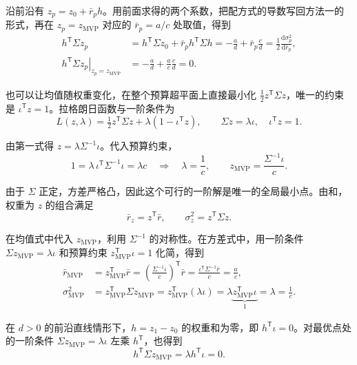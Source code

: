 \begin{solution}[label-content={方法二（沿前沿对配方后的方差式求导）},blank-type=none]
沿前沿有 $z_p=z_0+\bar r_p h$。用前面求得的两个系数，把配方式的导数写回方法一的形式，再在 $z_p=z_{\mathrm{MVP}}$ 对应的 $\bar r_p=a/c$ 处取值，得到
\[
 \begin{aligned}
 h^{\mathsf T}\Sigma z_p
 &=h^{\mathsf T}\Sigma z_0+\bar r_p h^{\mathsf T}\Sigma h
 =-\frac ad+\bar r_p\frac cd
 =\frac12\frac{\mathrm d\sigma_p^2}{\mathrm d\bar r_p},\\
 \left.h^{\mathsf T}\Sigma z_p\right|_{z_p=z_{\mathrm{MVP}}}
 &=-\frac ad+\frac ac\frac cd=0.
 \end{aligned}
\]
\end{solution}

\begin{solution}[label-content={方法三（拉格朗日法）},blank-type=none]
也可以让均值随权重变化，在整个预算超平面上直接最小化 $\tfrac12 z^{\mathsf T}\Sigma z$，唯一的约束是 $\iota^{\mathsf T}z=1$。拉格朗日函数与一阶条件为
\[
 L(z,\lambda)=\tfrac12 z^{\mathsf T}\Sigma z+\lambda(1-\iota^{\mathsf T}z),
 \qquad
 \Sigma z=\lambda\iota,\quad \iota^{\mathsf T}z=1.
\]

由第一式得 $z=\lambda\Sigma^{-1}\iota$。代入预算约束，
\[
 1=\lambda\,\iota^{\mathsf T}\Sigma^{-1}\iota=\lambda c
 \quad\Longrightarrow\quad
 \lambda=\frac1c,\qquad z_{\mathrm{MVP}}=\frac{\Sigma^{-1}\iota}{c}.
\]

由于 $\Sigma$ 正定，方差严格凸，因此这个可行的一阶解是唯一的全局最小点。由和，权重为 $z$ 的组合满足
\[
 \bar r_z=z^{\mathsf T}\bar r,
 \qquad
 \sigma_z^2=z^{\mathsf T}\Sigma z.
\]

在均值式中代入 $z_{\mathrm{MVP}}$，利用 $\Sigma^{-1}$ 的对称性。在方差式中，用一阶条件 $\Sigma z_{\mathrm{MVP}}=\lambda\iota$ 和预算约束 $z_{\mathrm{MVP}}^{\mathsf T}\iota=1$ 化简，得到
\[
 \begin{aligned}
 \bar r_{\mathrm{MVP}}
 &=z_{\mathrm{MVP}}^{\mathsf T}\bar r
 =\left(\frac{\Sigma^{-1}\iota}{c}\right)^{\mathsf T}\bar r
 =\frac{\iota^{\mathsf T}\Sigma^{-1}\bar r}{c}=\frac ac,\\
 \sigma_{\mathrm{MVP}}^2
 &=z_{\mathrm{MVP}}^{\mathsf T}\Sigma z_{\mathrm{MVP}}
 =z_{\mathrm{MVP}}^{\mathsf T}(\lambda\iota)
 =\lambda\underbrace{z_{\mathrm{MVP}}^{\mathsf T}\iota}_{1}
 =\lambda=\frac1c.
 \end{aligned}
\]

在 $d>0$ 的前沿直线情形下，$h=z_1-z_0$ 的权重和为零，即 $h^{\mathsf T}\iota=0$。对最优点处的一阶条件 $\Sigma z_{\mathrm{MVP}}=\lambda\iota$ 左乘 $h^{\mathsf T}$，也得到
\[
 h^{\mathsf T}\Sigma z_{\mathrm{MVP}}
 =\lambda h^{\mathsf T}\iota=0.
\]
\end{solution}

